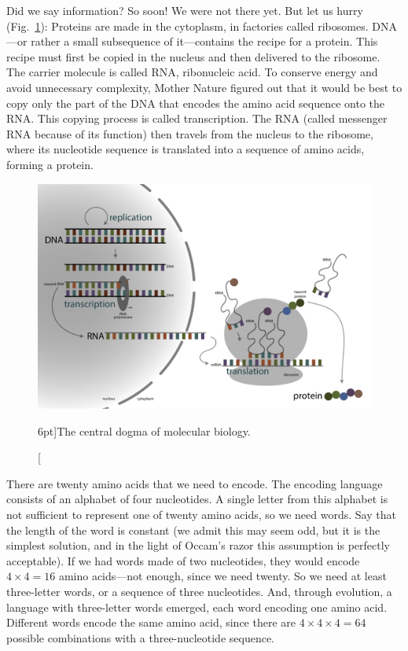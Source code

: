 Did we say information? So soon! We were not there yet. But let us hurry (Fig.~\ref{fig:central-dogma}): Proteins are made in the cytoplasm, in factories called ribosomes. DNA—or rather a small subsequence of it—contains the recipe for a protein. This recipe must first be copied in the nucleus and then delivered to the ribosome. The carrier molecule is called RNA, ribonucleic acid. To conserve energy and avoid unnecessary complexity, Mother Nature figured out that it would be best to copy only the part of the DNA that encodes the amino acid sequence onto the RNA. This copying process is called transcription. The RNA (called messenger RNA because of its function) then travels from the nucleus to the ribosome, where its nucleotide sequence is translated into a sequence of amino acids, forming a protein.

\begin{figure}
    \includegraphics{figs/molbiol/central-dogma.png}
    \caption[][6pt]{The central dogma of molecular biology.}
    \label{fig:central-dogma}
\end{figure}

There are twenty amino acids that we need to encode. The encoding language consists of an alphabet of four nucleotides. A single letter from this alphabet is not sufficient to represent one of twenty amino acids, so we need words. Say that the length of the word is constant (we admit this may seem odd, but it is the simplest solution, and in the light of Occam's razor this assumption is perfectly acceptable). If we had words made of two nucleotides, they would encode $4 \times 4 = 16$ amino acids—not enough, since we need twenty. So we need at least three-letter words, or a sequence of three nucleotides. And, through evolution, a language with three-letter words emerged, each word encoding one amino acid. Different words encode the same amino acid, since there are $4 \times 4 \times 4 = 64$ possible combinations with a three-nucleotide sequence.

